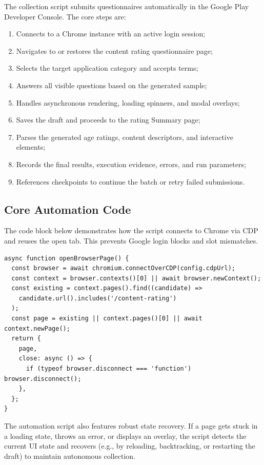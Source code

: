 \documentclass[11pt,a4paper]{article}
\begin{document}
The collection script submits questionnaires automatically in the Google Play Developer Console. The core steps are:
\begin{enumerate}[leftmargin=2em]
  \item Connects to a Chrome instance with an active login session;
  \item Navigates to or restores the content rating questionnaire page;
  \item Selects the target application category and accepts terms;
  \item Answers all visible questions based on the generated sample;
  \item Handles asynchronous rendering, loading spinners, and modal overlays;
  \item Saves the draft and proceeds to the rating Summary page;
  \item Parses the generated age ratings, content descriptors, and interactive elements;
  \item Records the final results, execution evidence, errors, and run parameters;
  \item References checkpoints to continue the batch or retry failed submissions.
\end{enumerate}

\subsection{Core Automation Code}

The code block below demonstrates how the script connects to Chrome via CDP and reuses the open tab. This prevents Google login blocks and slot mismatches.

\begin{lstlisting}[caption={CDP connection and page reuse logic}]
async function openBrowserPage() {
  const browser = await chromium.connectOverCDP(config.cdpUrl);
  const context = browser.contexts()[0] || await browser.newContext();
  const existing = context.pages().find((candidate) =>
    candidate.url().includes('/content-rating')
  );
  const page = existing || context.pages()[0] || await context.newPage();
  return {
    page,
    close: async () => {
      if (typeof browser.disconnect === 'function') browser.disconnect();
    },
  };
}
\end{lstlisting}

The automation script also features robust state recovery. If a page gets stuck in a loading state, throws an error, or displays an overlay, the script detects the current UI state and recovers (e.g., by reloading, backtracking, or restarting the draft) to maintain autonomous collection.
\end{document}
